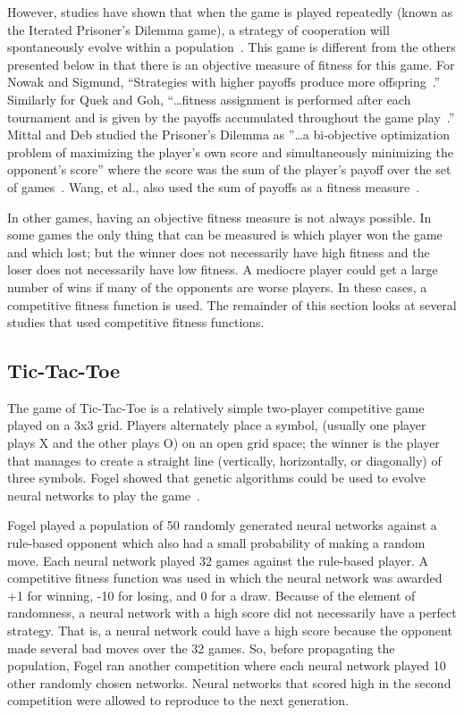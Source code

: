 However, studies have shown that when the game is played repeatedly (known as
the Iterated Prisoner's Dilemma game), a strategy of cooperation will
spontaneously evolve within a population~\cite{Axelrod1984, Nowak1993,
DBLP:conf/cig/QuekG07, Mittal2009, WangTao2010}. This game is different from the
others presented below in that there is an objective measure of fitness for this
game. For Nowak and Sigmund, ``Strategies with higher payoffs produce more
offspring~\cite{Nowak1993}.'' Similarly for Quek and Goh, ``\ldots fitness
assignment is performed after each tournament and is given by the payoffs
accumulated throughout the game play~\cite{DBLP:conf/cig/QuekG07}.'' Mittal and
Deb studied the Prisoner's Dilemma as ''\ldots a bi-objective optimization
problem of maximizing the player's own score and simultaneously minimizing the
opponent's score'' where the score was the sum of the player's payoff over the
set of games~\cite{Mittal2009}. Wang, et al., also used the sum of payoffs as a
fitness measure~\cite{WangTao2010}.

In other games, having an objective fitness measure is not always possible. In
some games the only thing that can be measured is which player won the game and
which lost; but the winner does not necessarily have high fitness and the loser
does not necessarily have low fitness. A mediocre player could get a large
number of wins if many of the opponents are worse players. In these cases, a
competitive fitness function is used. The remainder of this section looks at
several studies that used competitive fitness functions.

\subsection{Tic-Tac-Toe}

The game of Tic-Tac-Toe is a relatively simple two-player competitive game
played on a 3x3 grid. Players alternately place a symbol, (usually one player
plays X and the other plays O) on an open grid space; the winner is the player
that manages to create a straight line (vertically, horizontally, or diagonally)
of three symbols. Fogel showed that genetic algorithms could be used to evolve
neural networks to play the game~\cite{Fogel1993}.

Fogel played a population of 50 randomly generated neural networks against a
rule-based opponent which also had a small probability of making a random move.
Each neural network played 32 games against the rule-based player. A competitive
fitness function was used in which the neural network was awarded +1 for
winning, -10 for losing, and 0 for a draw. Because of the element of randomness,
a neural network with a high score did not necessarily have a perfect strategy.
That is, a neural network could have a high score because the opponent made
several bad moves over the 32 games. So, before propagating the population,
Fogel ran another competition where each neural network played 10 other randomly
chosen networks. Neural networks that scored high in the second competition were
allowed to reproduce to the next generation.


